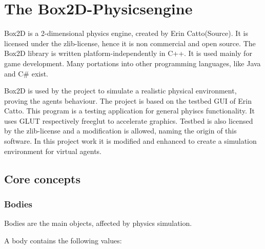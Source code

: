 \documentclass[10pt,a4paper,DIV=11]{scrreprt}
\begin{document}
\chapter{The Box2D-Physicsengine}
Box2D is a 2-dimensional physics engine, created by Erin Catto(Source). It is licensed under the zlib-license, hence it is non commercial and open source. The Box2D library is written platform-independently in C++. It is used mainly for game development. Many portations into other programming languages, like Java and C\# exist.

Box2D is used by the project to simulate a realistic physical environment, proving the agents behaviour. The project is based on the testbed GUI of Erin Catto. This program is a testing application for general phyiscs functionality. It uses GLUT respectively freeglut to accelerate graphics. Testbed is also licensed by the zlib-license and a modification is allowed, naming the origin of this software. In this project work it is modified and enhanced to create a simulation environment for virtual agents.


\section{Core concepts}

\subsection{Bodies}
Bodies are the main objects, affected by physics simulation.

A body contains the following values: \\

   \\
\\
\end{document}
